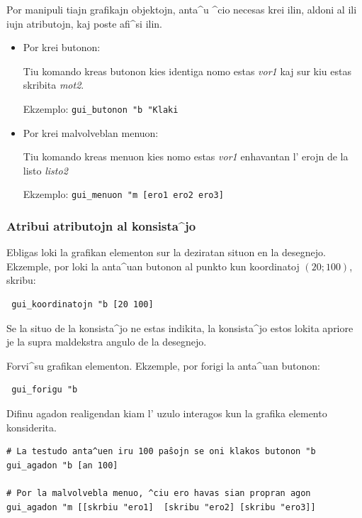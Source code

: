 Por manipuli tiajn grafikajn objektojn, anta^u ^cio necesas krei ilin,
aldoni al ili iujn atributojn, kaj poste afi^si ilin.

\begin{itemize}
\item Por krei butonon:


Tiu komando kreas butonon kies identiga nomo estas \textit{vor1} kaj
sur kiu estas skribita \textit{mot2}.

Ekzemplo: \texttt{gui\_butonon "b "Klaki}

\item Por krei malvolveblan menuon: 


Tiu komando kreas menuon kies nomo estas \textit{vor1} enhavantan l'
erojn de la listo \textit{listo2}

Ekzemplo: \texttt{gui\_menuon "m [ero1 ero2 ero3]}
\end{itemize}

\subsubsection{Atribui atributojn al konsista^jo}


Ebligas loki la grafikan elementon sur la deziratan situon en la
desegnejo.  Ekzemple, por loki la anta^uan butonon al punkto kun
koordinatoj $(20;100)$, skribu:

\begin{verbatim}
 gui_koordinatojn "b [20 100]
\end{verbatim}

Se la situo de la konsista^jo ne estas indikita, la konsista^jo estos
lokita apriore je la supra maldekstra angulo de la desegnejo.


Forvi^su grafikan elementon.  Ekzemple, por forigi la anta^uan
butonon:
\begin{verbatim}
 gui_forigu "b
\end{verbatim}


Difinu agadon realigendan kiam l' uzulo interagos kun la grafika
elemento konsiderita.

\begin{verbatim}
# La testudo anta^uen iru 100 paŝojn se oni klakos butonon "b
gui_agadon "b [an 100]

# Por la malvolvebla menuo, ^ciu ero havas sian propran agon
gui_agadon "m [[skrbiu "ero1]  [skribu "ero2] [skribu "ero3]]
\end{verbatim}

